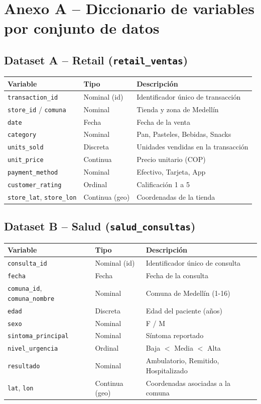 \documentclass[11pt]{article}
\begin{document}
\newpage
\appendix
\section*{Anexo A -- Diccionario de variables por conjunto de datos}

\subsection*{Dataset A -- Retail (\texttt{retail\_ventas})}
\begin{longtable}{p{3.2cm}p{3cm}p{7cm}}
\toprule
Variable & Tipo & Descripción \\
\midrule
\texttt{transaction\_id} & Nominal (id) & Identificador único de transacción \\
\texttt{store\_id} / \texttt{comuna} & Nominal & Tienda y zona de Medellín \\
\texttt{date} & Fecha & Fecha de la venta \\
\texttt{category} & Nominal & Pan, Pasteles, Bebidas, Snacks \\
\texttt{units\_sold} & Discreta & Unidades vendidas en la transacción \\
\texttt{unit\_price} & Continua & Precio unitario (COP) \\
\texttt{payment\_method} & Nominal & Efectivo, Tarjeta, App \\
\texttt{customer\_rating} & Ordinal & Calificación 1 a 5 \\
\texttt{store\_lat}, \texttt{store\_lon} & Continua (geo) & Coordenadas de la tienda \\
\bottomrule
\end{longtable}

\subsection*{Dataset B -- Salud (\texttt{salud\_consultas})}
\begin{longtable}{p{3.2cm}p{3cm}p{7cm}}
\toprule
Variable & Tipo & Descripción \\
\midrule
\texttt{consulta\_id} & Nominal (id) & Identificador único de consulta \\
\texttt{fecha} & Fecha & Fecha de la consulta \\
\texttt{comuna\_id}, \texttt{comuna\_nombre} & Nominal & Comuna de Medellín (1-16) \\
\texttt{edad} & Discreta & Edad del paciente (años) \\
\texttt{sexo} & Nominal & F / M \\
\texttt{sintoma\_principal} & Nominal & Síntoma reportado \\
\texttt{nivel\_urgencia} & Ordinal & Baja $<$ Media $<$ Alta \\
\texttt{resultado} & Nominal & Ambulatorio, Remitido, Hospitalizado \\
\texttt{lat}, \texttt{lon} & Continua (geo) & Coordenadas asociadas a la comuna \\
\bottomrule
\end{longtable}
\end{document}
